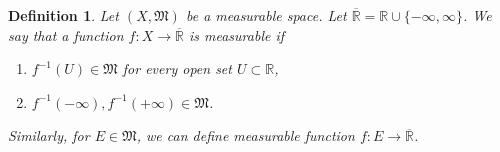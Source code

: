 \documentclass[11pt]{book}
\newtheorem{definition}{Definition}[chapter]
\theoremstyle{definition}
\numberwithin{equation}{chapter}
\begin{document}
\medskip

\begin{definition}
Let $(X,\mathfrak{M})$ be a measurable space. Let $\overline{\mathbb{R}} = \mathbb{R} \cup \{-\infty, \infty\}$. We say that a function $f: X \to \overline{\mathbb{R}}$ is measurable if 
\begin{enumerate}[label=(\alph*)]
    \item $f^{-1}(U) \in \mathfrak{M}$ for every open set $U \subset \mathbb{R}$,
    
    \item $f^{-1}(-\infty), f^{-1}(+\infty) \in \mathfrak{M}$.
\end{enumerate}
Similarly, for $E \in \mathfrak{M}$, we can define measurable function $f: E \to \overline{\mathbb{R}}$.
\end{definition}

\medskip
\end{document}
